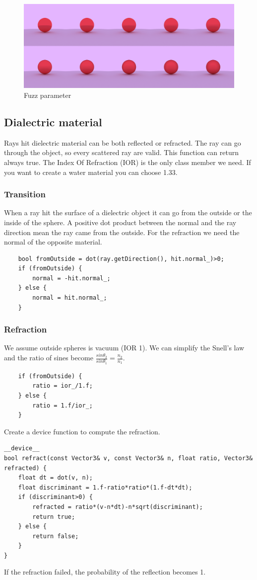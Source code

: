 \documentclass{article}
\begin{document}
\begin{figure}[h]
	\centering
	\includegraphics[scale=0.2]{figures/metalFuzz.png}
	\caption{Fuzz parameter}
\end{figure}

\subsection{Dialectric material}
Rays hit dielectric material can be both reflected or refracted. The ray can go through the object, so every scattered ray are valid. This function can return always true. The Index Of Refraction (IOR) is the only class member we need. If you want to create a water material you can choose 1.33.

\subsubsection{Transition}
When a ray hit the surface of a dielectric object it can go from the outside or the inside of the sphere. A positive dot product between the normal and the ray direction mean the ray came from the outside. For the refraction we need the normal of the opposite material.
\begin{lstlisting}
	bool fromOutside = dot(ray.getDirection(), hit.normal_)>0;
	if (fromOutside) {
		normal = -hit.normal_;
	} else {
		normal = hit.normal_;
	}
\end{lstlisting}

\subsubsection{Refraction}
We assume outside spheres is vacuum (IOR 1). We can simplify the Snell's law and the ratio of sines become $\frac{sin\theta_2}{sin\theta_1} = \frac{n_2}{n_1}$.
\begin{lstlisting}
	if (fromOutside) {
		ratio = ior_/1.f;
	} else {
		ratio = 1.f/ior_;
	}
\end{lstlisting}
Create a device function to compute the refraction.
\begin{lstlisting}
__device__ 
bool refract(const Vector3& v, const Vector3& n, float ratio, Vector3& refracted) {
	float dt = dot(v, n);
	float discriminant = 1.f-ratio*ratio*(1.f-dt*dt);
	if (discriminant>0) {
		refracted = ratio*(v-n*dt)-n*sqrt(discriminant);
		return true;
	} else {
		return false;
	}
}
\end{lstlisting}
If the refraction failed, the probability of the reflection becomes 1.
\end{document}
